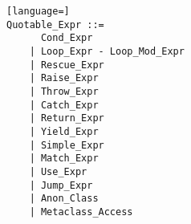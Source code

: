 \syntax\begin{lstlisting}[language=]
Quotable_Expr ::= 
      Cond_Expr 
    | Loop_Expr - Loop_Mod_Expr
    | Rescue_Expr
    | Raise_Expr
    | Throw_Expr
    | Catch_Expr
    | Return_Expr
    | Yield_Expr
    | Simple_Expr
    | Match_Expr
    | Use_Expr
    | Jump_Expr
    | Anon_Class
    | Metaclass_Access
\end{lstlisting}

















